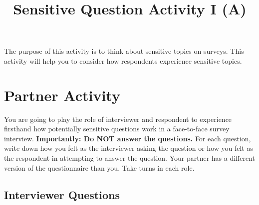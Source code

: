 \documentclass[a4, 12pt]{article}
\title{Sensitive Question Activity I (A)\vspace{-2em}}
\author{}
\date{}
\begin{document}
\maketitle

\noindent The purpose of this activity is to think about sensitive topics on surveys. This activity will help you to consider how respondents experience sensitive topics.

\section*{Partner Activity}

\noindent You are going to play the role of interviewer and respondent to experience firsthand how potentially sensitive questions work in a face-to-face survey interview. \textbf{Importantly: Do NOT answer the questions.} For each question, write down how you felt as the interviewer asking the question or how you felt as the respondent in attempting to answer the question. Your partner has a different version of the questionnaire than you. Take turns in each role.

\subsection*{Interviewer Questions}
\end{document}
